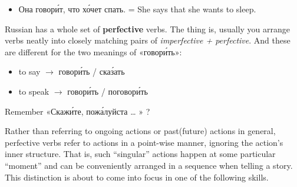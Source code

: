 \begin{itemize}
\tightlist
\item
  Она говор\'{и}т, что х\'{о}чет спать. = She says that she wants to sleep.
\end{itemize}

Russian has a whole set of \textbf{perfective} verbs. The thing is,
usually you arrange verbs neatly into closely matching pairs of
\emph{imperfective + perfective}. And these are different for the two
meanings of «говор\'{и}ть»:

\begin{itemize}
\tightlist
\item
  to say $ \rightarrow$ говор\'{и}ть / ска\'{з}ать
\item
  to speak $ \rightarrow$ говор\'{и}ть / поговор\'{и}ть
\end{itemize}

Remember «Скаж\'{и}те, пож\'{а}луйста \ldots{} » ?

Rather than referring to ongoing actions or past(future) actions in
general, perfective verbs refer to actions in a point-wise manner,
ignoring the action's inner structure. That is, such ``singular''
actions happen at some particular ``moment'' and can be conveniently
arranged in a sequence when telling a story. This distinction is about
to come into focus in one of the following skills.
